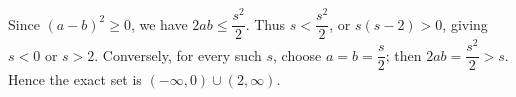 Since $(a-b)^2\ge0$, we have $2ab\le\dfrac{s^2}{2}$. Thus $s<\dfrac{s^2}{2}$, or $s(s-2)>0$, giving $s<0$ or $s>2$. Conversely, for every such $s$, choose $a=b=\dfrac{s}{2}$; then $2ab=\dfrac{s^2}{2}>s$. Hence the exact set is $\boxed{(-\infty,0)\cup(2,\infty)}$.

